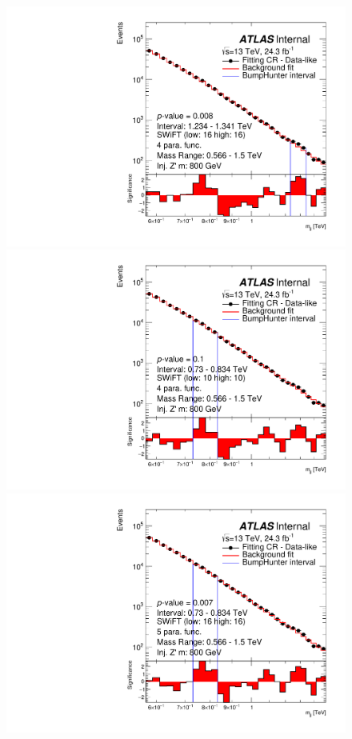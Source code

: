\begin{figure}[!htb]
\captionsetup[subfigure]{aboveskip=0pt,justification=centering}
\centering
{} {
  \includegraphics[width=0.45\linewidth, angle=0]{figs/Dibjet/LowMass/FitStudy_min566/bhFit_corrFitCR_dataLike_4para_low16_high16_inj_Zprimebb800_xsFactor1.pdf}
}
 {
  \includegraphics[width=0.45\linewidth, angle=0]{figs/Dibjet/LowMass/FitStudy_min566/bhFit_corrFitCR_dataLike_4para_low10_high10_inj_Zprimebb800_xsFactor1.pdf}
}
 {
  \includegraphics[width=0.45\linewidth, angle=0]{figs/Dibjet/LowMass/FitStudy_min566/bhFit_corrFitCR_dataLike_5para_low16_high16_inj_Zprimebb800_xsFactor1.pdf}
}
\end{figure}
